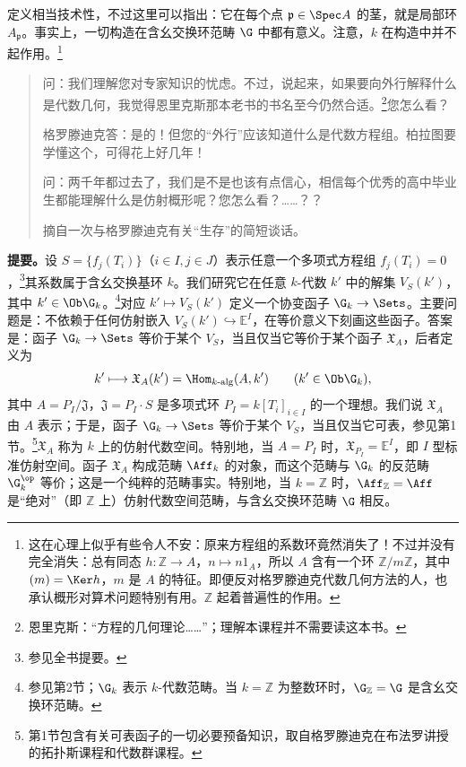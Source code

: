 定义相当技术性，不过这里可以指出：它在每个点 $\mathfrak p\in\Spec A$ 的茎，就是局部环 $A_{\mathfrak p}$。事实上，一切构造在含幺交换环范畴 $\G$ 中都有意义。注意，$k$ 在构造中并不起作用。\footnote{这在心理上似乎有些令人不安：原来方程组的系数环竟然消失了！不过并没有完全消失：总有同态 $h:\mathbb Z\to A$，$n\mapsto n1_A$，所以 $A$ 含有一个环 $\mathbb Z/m\mathbb Z$，其中 $(m)=\Ker h$，$m$ 是 $A$ 的特征。即便反对格罗滕迪克代数几何方法的人，也承认概形对算术问题特别有用。$\mathbb Z$ 起着普遍性的作用。}

\begin{quote}
问：我们理解您对专家知识的忧虑。不过，说起来，如果要向外行解释什么是代数几何，我觉得恩里克斯那本老书的书名至今仍然合适。\footnote{恩里克斯：“方程的几何理论……”；理解本课程并不需要读这本书。}您怎么看？

格罗滕迪克答：是的！但您的“外行”应该知道什么是代数方程组。柏拉图要学懂这个，可得花上好几年！

问：两千年都过去了，我们是不是也该有点信心，相信每个优秀的高中毕业生都能理解什么是仿射概形呢？您怎么看？……？？
\begin{flushright}摘自一次与格罗滕迪克有关“生存”的简短谈话。\end{flushright}
\end{quote}
\textbf{提要。}设 $S=\{f_j(T_i)\}$（$i\in I,j\in J$）表示任意一个多项式方程组 $f_j(T_i)=0$，\footnote{参见全书提要。}其系数属于含幺交换基环 $k$。我们研究它在任意 $k$-代数 $k'$ 中的解集 $V_S(k')$，其中 $k'\in\Ob\G_k$。\footnote{参见第2节；$\G_k$ 表示 $k$-代数范畴。当 $k=\mathbb Z$ 为整数环时，$\G_{\mathbb Z}=\G$ 是含幺交换环范畴。}对应 $k'\mapsto V_S(k')$ 定义一个协变函子 $\G_k\to\Sets$。主要问题是：不依赖于任何仿射嵌入 $V_S(k')\hookrightarrow\mathbb E^I$，在等价意义下刻画这些函子。答案是：函子 $\G_k\to\Sets$ 等价于某个 $V_S$，当且仅当它等价于某个函子 $\mathfrak X_A$，后者定义为
\[
k'\longmapsto\mathfrak X_A(k')=\Hom_{k\text{-alg}}(A,k')
\qquad(k'\in\Ob\G_k),
\]
其中 $A=P_I/\mathfrak J$，$\mathfrak J=P_I\cdot S$ 是多项式环 $P_I=k[T_i]_{i\in I}$ 的一个理想。我们说 $\mathfrak X_A$ 由 $A$ 表示；于是，函子 $\G_k\to\Sets$ 等价于某个 $V_S$，当且仅当它可表，参见第1节。\footnote{第1节包含有关可表函子的一切必要预备知识，取自格罗滕迪克在布法罗讲授的拓扑斯课程和代数群课程。}$\mathfrak X_A$ 称为 $k$ 上的仿射代数空间。特别地，当 $A=P_I$ 时，$\mathfrak X_{P_I}=\mathbb E^I$，即 $I$ 型标准仿射空间。函子 $\mathfrak X_A$ 构成范畴 $\Aff_k$ 的对象，而这个范畴与 $\G_k$ 的反范畴 $\G_k^{\op}$ 等价；这是一个纯粹的范畴事实。特别地，当 $k=\mathbb Z$ 时，$\Aff_{\mathbb Z}=\Aff$ 是“绝对”（即 $\mathbb Z$ 上）仿射代数空间范畴，与含幺交换环范畴 $\G$ 相反。


